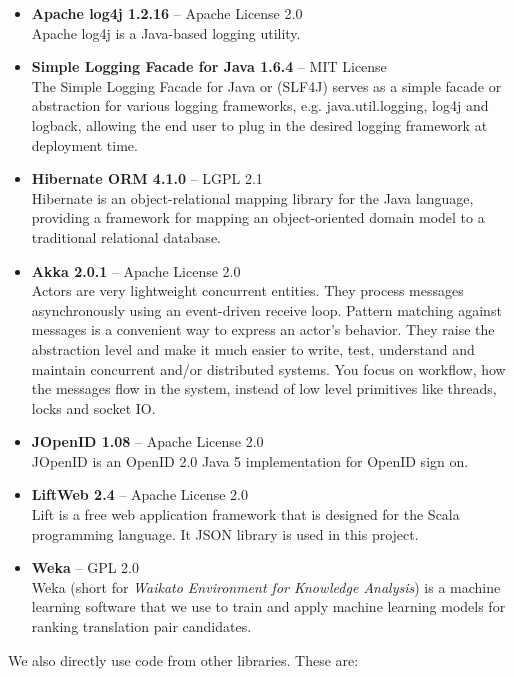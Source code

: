 \begin{itemize}
\item {\bf Apache log4j 1.2.16}  -- Apache License 2.0 \\
Apache log4j is a Java-based logging utility.

\item {\bf Simple Logging Facade for Java 1.6.4} -- MIT License \\
The Simple Logging Facade for Java or (SLF4J) serves as a simple facade or abstraction for various logging frameworks, e.g. java.util.logging, log4j and logback, allowing the end user to plug in the desired logging framework at deployment time.

\item {\bf Hibernate ORM 4.1.0} -- LGPL 2.1 \\
Hibernate is an object-relational mapping library for the Java language, providing a framework for mapping an object-oriented domain model to a traditional relational database.

\item {\bf Akka 2.0.1} -- Apache License 2.0 \\
Actors are very lightweight concurrent entities. They process messages asynchronously using an event-driven receive loop. Pattern matching against messages is a convenient way to express an actor's behavior. They raise the abstraction level and make it much easier to write, test, understand and maintain concurrent and/or distributed systems. You focus on workflow, how the messages flow in the system, instead of low level primitives like threads, locks and socket IO.
 
\item {\bf JOpenID 1.08} -- Apache License 2.0 \\
JOpenID is an OpenID 2.0 Java 5 implementation for OpenID sign on.

\item {\bf LiftWeb 2.4} -- Apache License 2.0 \\
Lift is a free web application framework that is designed for the Scala programming language. It JSON library is used in this project.

\item {\bf Weka} -- GPL 2.0\\
Weka (short for \emph{Waikato Environment for Knowledge Analysis}) is a machine learning software that we use to train and apply machine learning models for ranking translation pair candidates.
\end{itemize}

We also directly use code from other libraries. These are:

